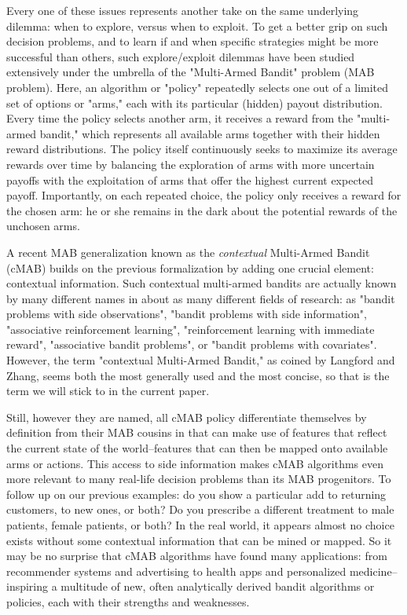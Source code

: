 \documentclass[nojss]{jss}\usepackage[]{graphicx}\usepackage[]{color}
\begin{document}
Every one of these issues represents another take on the same underlying dilemma: when to explore, versus when to exploit. To get a better grip on such decision problems, and to learn if and when specific strategies might be more successful than others, such explore/exploit dilemmas have been studied extensively under the umbrella of the "Multi-Armed Bandit" problem (MAB problem). Here, an algorithm or "policy" repeatedly selects one out of a limited set of options or "arms," each with its particular (hidden) payout distribution. Every time the policy selects another arm, it receives a reward from the "multi-armed bandit," which represents all available arms together with their hidden reward distributions. The policy itself continuously seeks to maximize its average rewards over time by balancing the exploration of arms with more uncertain payoffs with the exploitation of arms that offer the highest current expected payoff. Importantly, on each repeated choice, the policy only receives a reward for the chosen arm: he or she remains in the dark about the potential rewards of the unchosen arms.

A recent MAB generalization known as the \textit{contextual} Multi-Armed Bandit (cMAB) builds on the previous formalization by adding one crucial element: contextual information. Such contextual multi-armed bandits are actually known by many different names in about as many different fields of research: as "bandit problems with side observations", "bandit problems with side information", "associative reinforcement learning", "reinforcement learning with immediate reward", "associative bandit problems", or "bandit problems with covariates". However, the term "contextual Multi-Armed Bandit," as coined by Langford and Zhang, seems both the most generally used and the most concise, so that is the term we will stick to in the current paper.

Still, however they are named, all cMAB policy differentiate themselves by definition from their MAB cousins in that can make use of features that reflect the current state of the world--features that can then be mapped onto available arms or actions. This access to side information makes cMAB algorithms even more relevant to many real-life decision problems than its MAB progenitors. To follow up on our previous examples: do you show a particular add to returning customers, to new ones, or both? Do you prescribe a different treatment to male patients, female patients, or both? In the real world, it appears almost no choice exists without some contextual information that can be mined or mapped. So it may be no surprise that cMAB algorithms have found many applications: from recommender systems and advertising to health apps and personalized medicine--inspiring a multitude of new, often analytically derived bandit algorithms or policies, each with their strengths and weaknesses.
\end{document}
